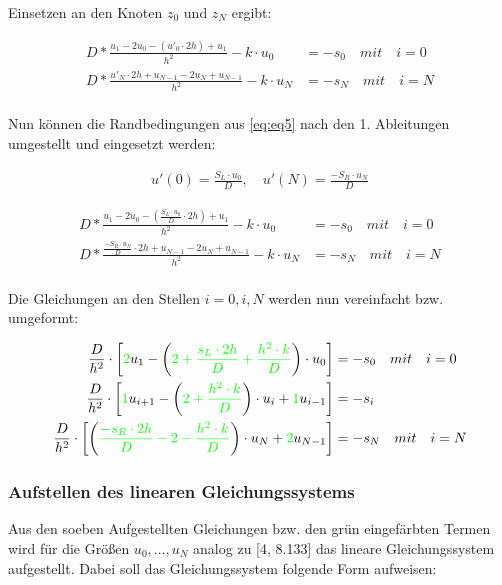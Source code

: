 \documentclass[
	pagesize,
	fontsize=12pt,
	paper=a4,
	oneside,
   reqno
]{scrartcl}
\begin{document}
Einsetzen an den Knoten $z_0$ und $z_N$ ergibt:

\begin{align*}
   D*\frac{u_1-2u_0-(u'_0\cdot 2h)+u_1}{h^2} - k\cdot u_0 &= -s_0 \quad mit \quad i = 0 \\
   D*\frac{u'_N\cdot 2h+u_{N-1}-2u_N+u_{N-1}}{h^2} - k\cdot u_N &= -s_N \quad mit \quad i = N \\
\end{align*}

Nun können die Randbedingungen aus \autoref{eq:eq5} nach den 1. Ableitungen umgestellt und eingesetzt werden:

\begin{align*}
   u'(0) = \frac{S_L \cdot u_0}{D}, \quad u'(N) = \frac{-S_R \cdot u_N}{D}
\end{align*}

\begin{align*}
   D*\frac{u_1-2u_0-(\frac{S_L \cdot u_0}{D}\cdot 2h)+u_1}{h^2} - k\cdot u_0 &= -s_0 \quad mit \quad i = 0 \\
   D*\frac{\frac{-S_R \cdot u_N}{D}\cdot 2h+u_{N-1}-2u_N+u_{N-1}}{h^2} - k\cdot u_N &= -s_N \quad mit \quad i = N \\
\end{align*}

Die Gleichungen an den Stellen $i=0, i, N$ werden nun vereinfacht bzw. umgeformt:

\begin{align*}
   \frac{D}{h^2}\cdot \left[ \textcolor{green}{2}u_1-\left( \textcolor{green}{2+\frac{s_L\cdot 2h}{D}+\frac{h^2\cdot k}{D}}\right) \cdot u_0\right] &= -s_0 \quad mit \quad i = 0 \\
   \frac{D}{h^2}\cdot \left[ \textcolor{green}{1}u_{i+1}-\left( \textcolor{green}{2+\frac{h^2\cdot k}{D}}\right) \cdot u_i+\textcolor{green}{1}u_{i-1}\right] &= -s_i \\
   \frac{D}{h^2}\cdot \left[ \left( \textcolor{green}{\frac{-s_R\cdot 2h}{D}-2-\frac{h^2\cdot k}{D}}\right) \cdot u_N+\textcolor{green}{2}u_{N-1}\right] &= -s_N \quad mit \quad i = N \\
\end{align*}

\subsubsection{Aufstellen des linearen Gleichungssystems}

Aus den soeben Aufgestellten Gleichungen bzw. den grün eingefärbten Termen wird für die Größen $u_0, ... , u_{N}$ analog zu [4, 8.133] das lineare Gleichungssystem aufgestellt. Dabei soll das Gleichungssystem folgende Form aufweisen:
\end{document}
